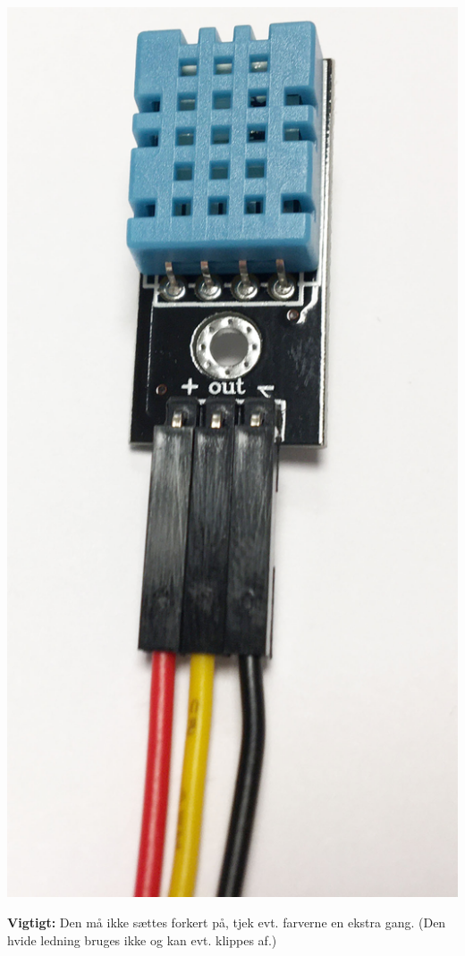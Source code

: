 \documentclass{ucph-handout}
\begin{document}
\begin{exercisebox}[adjusted title=Tilslut fugtighedssensor]
\begin{center}
\begin{minipage}{0.1\linewidth}
  \includegraphics[width=\textwidth]{illustrationer/dht11}
\end{minipage}
\end{center}

\textbf{Vigtigt:} Den må ikke sættes forkert på, tjek evt. farverne en
ekstra gang. (Den hvide ledning bruges ikke og kan evt. klippes af.)
\end{exercisebox}
\end{document}
